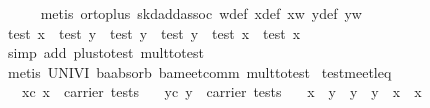 \begin{isabellebody}
\ \ \ \ \isamarkupfalse%
\ {}metis\ or{}to{}plus\ skd{}add{}assoc\ w{}{}def\ x{}{}def\ xw\ y{}{}def\ yw{}\isanewline
{}\isamarkupfalse%
%
\endisatagproof
{\isafoldproof}%
%
\isadelimproof
\isanewline
%
\endisadelimproof
\isanewline
{}\isamarkupfalse%
\ {}test\ x\ {}\ test\ y\ {}\ test\ y\ {}\ test\ y\ {}\ test\ x\ {}\ test\ x{}\isanewline
%
\isadelimproof
\ \ %
\endisadelimproof
%
\isatagproof
{}\isamarkupfalse%
\ {}simp\ add{}\ plus{}to{}test\ mult{}to{}test{}\isanewline
\ \ \isamarkupfalse%
\ {}metis\ UNIV{}I\ ba{}absorb{}\ ba{}meet{}comm\ mult{}to{}test{}%
\endisatagproof
{\isafoldproof}%
%
\isadelimproof
\isanewline
%
\endisadelimproof
\isanewline
{}\isamarkupfalse%
\ test{}meet{}leq{}{}\isanewline
\ \ \ xc{}\ {}x\ {}\ carrier\ tests{}\isanewline
\ \ \ yc{}\ {}y\ {}\ carrier\ tests{}\isanewline
\ \ \ {}x\ {}\ y\ {}\ y\ {}\ y\ {}\ x\ {}\ x{}\isanewline

\end{isabellebody}
